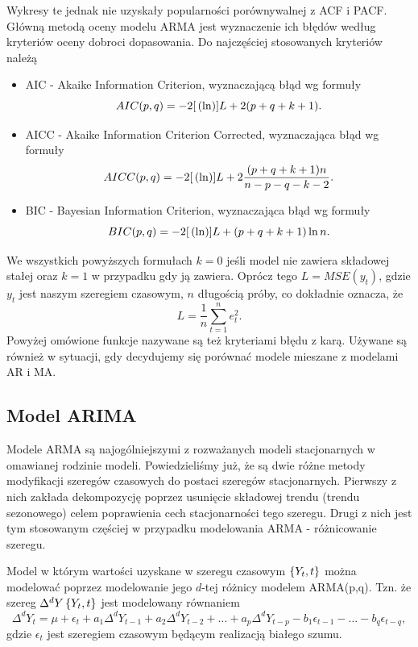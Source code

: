 \documentclass[10pt,a4paper]{book}
\begin{document}
Wykresy te jednak nie uzyskały popularności porównywalnej z ACF i PACF. Główną metodą oceny modelu ARMA jest wyznaczenie ich błędów według kryteriów oceny dobroci dopasowania. Do najczęściej stosowanych kryteriów należą 

\begin{itemize}
\item AIC - Akaike Information Criterion, wyznaczającą błąd wg formuły 
$$
AIC(p,q) = -2 {{[}\left( {\ln} \right)}]{L} + 2 {\left( {p+q+k+1} \right)}.
$$
\item AICC - Akaike Information Criterion Corrected, wyznaczająca błąd wg formuły 
$$
AICC(p,q) = -2 {{[}\left( {\ln} \right)}]{L} + 2 \frac{{\left( {p+q+k+1} \right)}  n}{n-p-q-k-2}.
$$
\item BIC - Bayesian Information Criterion, wyznaczająca błąd wg formuły
$$
BIC(p,q) = -2 {{[}\left( {\ln} \right)}]{L} + {\left( {p+q+k+1} \right)} \ln n.
$$
\end{itemize}
We wszystkich powyższych formułach $k=0$ jeśli model nie zawiera składowej stałej oraz $k=1$ w przypadku gdy ją zawiera. Oprócz tego $L=MSE(y_t)$, gdzie $y_t$ jest naszym szeregiem czasowym, $n$ długością próby, co dokładnie oznacza, że 
$$
L = \frac{1}{n} \sum_{t=1}^{n} e_t^2.
$$
Powyżej omówione funkcje nazywane są też kryteriami błędu z karą. Używane są również w sytuacji, gdy decydujemy się porównać modele mieszane z modelami AR i MA.

\subsection{Model ARIMA}

Modele ARMA są najogólniejszymi z rozważanych modeli stacjonarnych w omawianej rodzinie modeli. Powiedzieliśmy już, że są dwie różne metody modyfikacji szeregów czasowych do postaci szeregów stacjonarnych. Pierwszy z nich zakłada dekompozycję poprzez usunięcie składowej trendu (trendu sezonowego) celem poprawienia cech stacjonarności tego szeregu. Drugi z nich jest tym stosowanym częściej w przypadku modelowania ARMA - różnicowanie szeregu.

\begin{definition} 
Model w którym wartości uzyskane w szeregu czasowym $\left\lbrace {{Y_t}, {t}} \right\rbrace$ można modelować poprzez modelowanie jego $d$-tej różnicy modelem ARMA(p,q). Tzn. że szereg $\Delta^d Y\left\lbrace {{Y_t}, {t}} \right\rbrace$ jest modelowany równaniem 
$$
\Delta^d Y_t = \mu + \epsilon_t + a_1 \Delta^d Y_{t-1} + a_2 \Delta^d Y_{t-2} + \ldots + a_p \Delta^d Y_{t-p} - b_1 \epsilon_{t-1} -\ldots - b_q \epsilon_{t-q} ,
$$
gdzie $\epsilon_t $ jest szeregiem czasowym będącym realizacją białego szumu.
\end{definition}
\end{document}
